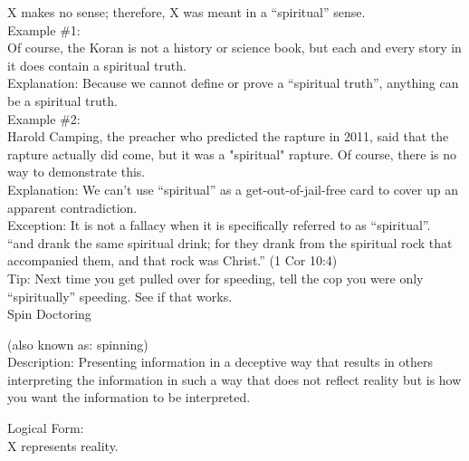 \documentclass[a4paper,12pt,single,pdftex]{scrbook}
\begin{document}
    
      X makes no sense; therefore, X was meant in a “spiritual” sense.
    \\

    
      Example \#1:
    \\

    
      Of course, the Koran is not a history or science book, but each and every story in it does contain a spiritual truth.
    \\

    
      Explanation: Because we cannot define or prove a “spiritual truth”, anything can be a spiritual truth.
    \\

    
      Example \#2:
    \\

    
      Harold Camping, the preacher who predicted the rapture in 2011, said that the rapture actually did come, but it was a "spiritual" rapture.  Of course, there is no way to demonstrate this.
    \\

    
      Explanation: We can’t use “spiritual” as a get-out-of-jail-free card to cover up an apparent contradiction.
    \\

    
      Exception: It is not a fallacy when it is specifically referred to as “spiritual”.
    \\

    
      “and drank the same spiritual drink; for they drank from the spiritual rock that accompanied them, and that rock was Christ.” (1 Cor 10:4)
    \\

    
      Tip: Next time you get pulled over for speeding, tell the cop you were only “spiritually” speeding. See if that works.
    \\

  

Spin Doctoring
    
      (also known as: spinning)
    \\

  
    Description: Presenting information in a deceptive way that results in others interpreting the information in such a way that does not reflect reality but is how you want the information to be interpreted.

    
      Logical Form:
    \\

    
      X represents reality.
    \\
\end{document}
